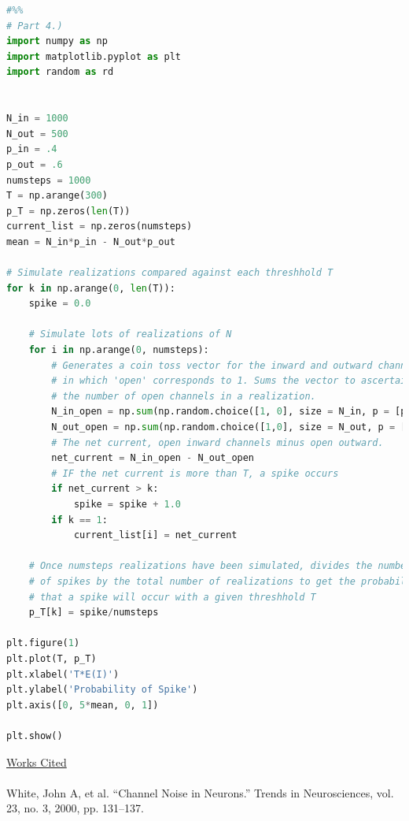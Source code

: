 \documentclass{article}
\begin{document}
\begin{lstlisting}[language = Python]
#%%
# Part 4.)
import numpy as np
import matplotlib.pyplot as plt
import random as rd


N_in = 1000
N_out = 500
p_in = .4
p_out = .6
numsteps = 1000
T = np.arange(300)
p_T = np.zeros(len(T))
current_list = np.zeros(numsteps)
mean = N_in*p_in - N_out*p_out

# Simulate realizations compared against each threshhold T
for k in np.arange(0, len(T)):
    spike = 0.0
    
    # Simulate lots of realizations of N
    for i in np.arange(0, numsteps):
        # Generates a coin toss vector for the inward and outward channels
        # in which 'open' corresponds to 1. Sums the vector to ascertain
        # the number of open channels in a realization.
        N_in_open = np.sum(np.random.choice([1, 0], size = N_in, p = [p_in, 1 - p_in]))
        N_out_open = np.sum(np.random.choice([1,0], size = N_out, p = [p_out, 1 - p_out]))
        # The net current, open inward channels minus open outward.
        net_current = N_in_open - N_out_open
        # IF the net current is more than T, a spike occurs
        if net_current > k:
            spike = spike + 1.0
        if k == 1:
            current_list[i] = net_current
            
    # Once numsteps realizations have been simulated, divides the number
    # of spikes by the total number of realizations to get the probability
    # that a spike will occur with a given threshhold T
    p_T[k] = spike/numsteps

plt.figure(1)
plt.plot(T, p_T)
plt.xlabel('T*E(I)')
plt.ylabel('Probability of Spike')
plt.axis([0, 5*mean, 0, 1])

plt.show()
\end{lstlisting}
\underline{Works Cited}\\
\\
White, John A, et al. “Channel Noise in Neurons.” Trends in Neurosciences, vol. 23, no. 3, 2000, pp. 131–137.
\end{document}
